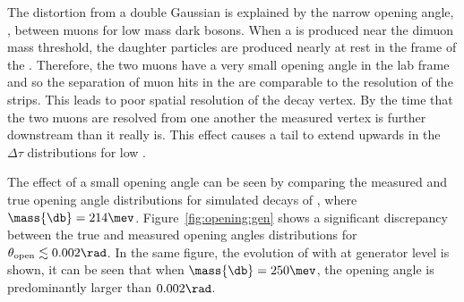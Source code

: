The distortion from a double Gaussian is explained by the narrow opening angle, \thetaopen, between
muons for low mass dark bosons.
When a \db is produced near the dimuon mass threshold, the daughter particles are produced nearly
at rest in the frame of the \db.
Therefore, the two muons have a very small opening angle in the lab frame and so the separation of
muon hits in the \velo are comparable to the resolution of the \velo strips.
This leads to poor spatial resolution of the \db decay vertex.
By the time that the two muons are resolved from one another the measured vertex is further
downstream than it really is.
This effect causes a tail to extend upwards in the $\Delta\tau$ distributions for low \mdb.

The effect of a small opening angle can be seen by comparing the measured and true opening angle
distributions for simulated decays of \btokstrdb, where $\mass{\db}=214\mev$.
Figure~\ref{fig:opening:gen} shows a significant discrepancy between the
true and measured opening angles
distributions for $\theta_\mathrm{open}\lesssim0.002\rad$.
In the same figure, the evolution of \thetaopen with \mass{\db} at generator level is shown, it can
be seen that when $\mass{\db}=250\mev$, the opening angle is predominantly larger than $0.002\rad$.


